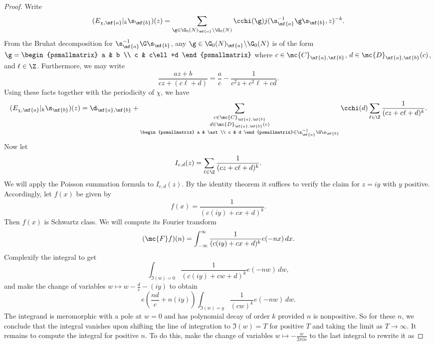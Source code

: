 \documentclass[12pt]{article}
\begin{document}
      \begin{proof}
        Write
        \[
          (E_{\chi,\mf{a}}|_{k}\s_{\mf{b}})(z) = \sum_{\g \in \G_{0}(N)_{\mf{a}}\backslash\G_{0}(N)}\cchi(\g)j(\s_{\mf{a}}^{-1}\g\s_{\mf{b}},z)^{-k}.
        \]
        From the Bruhat decomposition for \(\s_{\mf{a}}^{-1}\G\s_{\mf{b}}\), any \(\g \in \G_{0}(N)_{\mf{a}}\backslash\G_{0}(N)\) is of the form \(\g = \begin{psmallmatrix} a & b \\ c & c\ell+d \end{psmallmatrix}\) where \(c \in \mc{C}_{\mf{a},\mf{b}}\), \(d \in \mc{D}_{\mf{a},\mf{b}}(c)\), and \(\ell \in \Z\). Furthermore, we may write
        \[
          \frac{az+b}{cz+(c\ell+d)} = \frac{a}{c}-\frac{1}{c^{2}z+c^{2}\ell+cd}.
        \]
        Using these facts together with the periodicity of \(\chi\), we have
        \[
          (E_{\chi,\mf{a}}|_{k}\s_{\mf{b}})(z) = \d_{\mf{a},\mf{b}}+\sum_{\substack{\substack{c \in \mc{C}_{\mf{a},\mf{b}} \\ d \in \mc{D}_{\mf{a},\mf{b}}(c)} \\ \begin{psmallmatrix} a & \ast \\ c & d \end{psmallmatrix} \in \s_{\mf{a}}^{-1}\G\s_{\mf{b}}}}\cchi(d)\sum_{\ell \in \Z}\frac{1}{(cz+c\ell+d)^{k}}.
        \]
        Now let
        \[
          I_{c,d}(z) = \sum_{\ell \in \Z}\frac{1}{(cz+c\ell+d)^{k}}.
        \]
        We will apply the Poisson summation formula to \(I_{c,d}(z)\). By the identity theorem it suffices to verify the claim for \(z = iy\) with \(y\) positive. Accordingly, let \(f(x)\) be given by
        \[
          f(x) = \frac{1}{(c(iy)+cx+d)^{k}}.
        \]
        Then \(f(x)\) is Schwartz class. We will compute its Fourier transform
        \[
          (\mc{F}f)(n) = \int_{-\infty}^{\infty}\frac{1}{(c(iy)+cx+d)^{k}}e(-nx)\,dx.
        \]
        Complexify the integral to get
        \[
          \int_{\Im(w) = 0}\frac{1}{(c(iy)+cw+d)^{k}}e(-nw)\,dw,
        \]
        and make the change of variables \(w \mapsto w-\frac{d}{c}-(iy)\) to obtain
        \[
          e\left(\frac{nd}{c}+n(iy)\right)\int_{\Im(w) = y}\frac{1}{(cw)^{k}}e(-nw)\,dw.
        \]
        The integrand is meromorphic with a pole at \(w = 0\) and has polynomial decay of order \(k\) provided \(n\) is nonpositive. So for these \(n\), we conclude that the integral vanishes upon shifting the line of integration to \(\Im(w) = T\) for positive \(T\) and taking the limit as \(T \to \infty\). It remains to compute the integral for positive \(n\). To do this, make the change of variables \(w \mapsto -\frac{w}{2\pi in}\) to the last integral to rewrite it as

\end{proof}
\end{document}
